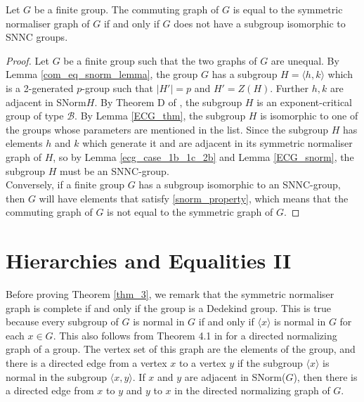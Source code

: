 \begin{thm}\label{Equality_com} 
    Let $G$ be a finite group. The commuting graph of $G$ is equal to the symmetric normaliser graph of $G$ if and only if $G$ does not have a subgroup isomorphic to SNNC groups.
\end{thm} 
\begin{proof} 
    Let $G$ be a finite group such that the two graphs of $G$ are unequal. By Lemma \ref{com_eq_snorm_lemma}, the group $G$ has a subgroup $H = \langle h, k \rangle$ which is a 2-generated $p$-group such that $|H'| =p$ and $H' = Z(H)$. Further $h, k$ are adjacent in SNorm$H$. By Theorem D of \cite{BCMV2025}, the subgroup $H$ is an exponent-critical group of type $\mathcal{B}$. By Lemma \ref{ECG_thm}, the subgroup $H$ is isomorphic to one of the groups whose parameters are mentioned in the list. Since the subgroup $H$ has elements $h$ and $k$ which generate it and are adjacent in its symmetric normaliser graph of $H$, so by Lemma \ref{ecg_case_1b_1c_2b} and Lemma \ref{ECG_snorm}, the subgroup $H$ must be an SNNC-group. \\
     Conversely, if a finite group $G$ has a subgroup isomorphic to an SNNC-group, then $G$ will have elements that satisfy \ref{snorm_property}, which means that the commuting graph of $G$ is not equal to the symmetric graph of $G$. 
\end{proof}

\section{Hierarchies and Equalities II}
Before proving Theorem \ref{thm_3}, we remark that the symmetric normaliser graph is complete if and only if the group is a Dedekind group. This is true because every subgroup of $G$ is normal in $G$ if and only if $\langle x \rangle$ is normal in $G$ for each $x \in G$. This also follows from Theorem 4.1 in \cite{DGM2025} for a directed normalizing graph of a group. The vertex set of this graph are the elements of the group, and there is a directed edge from a vertex $x$ to a vertex $y$ if the subgroup $\langle x \rangle$ is normal in the subgroup $\langle x,y \rangle$. If $x$ and $y$ are adjacent in SNorm($G$), then there is a directed edge from $x$ to $y$ and $y$ to $x$ in the directed normalizing graph of $G$.

